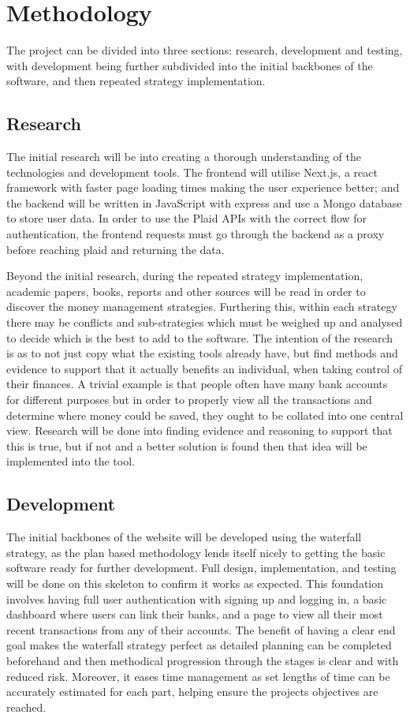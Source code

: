 \section{Methodology}
The project can be divided into three sections: research, development and testing, with development being further subdivided into the initial backbones of the software, and then repeated strategy implementation.


\subsection{Research}
The initial research will be into creating a thorough understanding of the technologies and development tools. The frontend will utilise Next.js, a react framework with faster page loading times making the user experience better; and the backend will be written in JavaScript with express and use a Mongo database to store user data. In order to use the Plaid APIs with the correct flow for authentication, the frontend requests must go through the backend as a proxy before reaching plaid and returning the data. 

Beyond the initial research, during the repeated strategy implementation, academic papers, books, reports and other sources will be read in order to discover the money management strategies. Furthering this, within each strategy there may be conflicts and sub-strategies which must be weighed up and analysed to decide which is the best to add to the software. The intention of the research is as to not just copy what the existing tools already have, but find methods and evidence to support that it actually benefits an individual, when taking control of their finances. A trivial example is that people often have many bank accounts for different purposes but in order to properly view all the transactions and determine where money could be saved, they ought to be collated into one central view. Research will be done into finding evidence and reasoning to support that this is true, but if not and a better solution is found then that idea will be implemented into the tool.

\subsection{Development}
The initial backbones of the website will be developed using the waterfall strategy, as the plan based methodology lends itself nicely to getting the basic software ready for further development. Full design, implementation, and testing will be done on this skeleton to confirm it works as expected. This foundation involves having full user authentication with signing up and logging in, a basic dashboard where users can link their banks, and a page to view all their most recent transactions from any of their accounts. The benefit of having a clear end goal makes the waterfall strategy perfect as detailed planning can be completed beforehand and then methodical progression through the stages is clear and with reduced risk. Moreover, it eases time management as set lengths of time can be accurately estimated for each part, helping ensure the projects objectives are reached.

